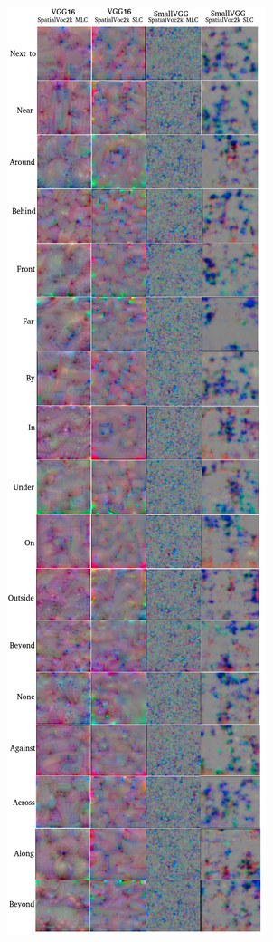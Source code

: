 \documentclass{IEEEtran}
\begin{document}
\begin{figure}[!htbp]
	\includegraphics[scale=0.40]{SV_16_small.pdf}
	\vspace{-4mm}
\end{figure}
\end{document}
